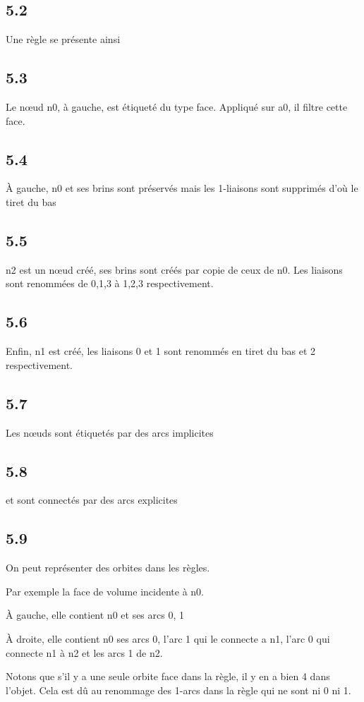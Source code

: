 \documentclass[11pt]{article}
\begin{document}
\subsection{5.2}
\label{sec:orgb3f587e}
Une règle se présente ainsi
\subsection{5.3}
\label{sec:orgb9b09c7}
Le nœud n0, à gauche, est étiqueté du type face. Appliqué sur a0, il filtre cette face.
\subsection{5.4}
\label{sec:orgd238df2}
À gauche, n0 et ses brins sont préservés mais les 1-liaisons sont supprimés d'où le tiret du bas
\subsection{5.5}
\label{sec:orgefde96f}
n2 est un nœud créé, ses brins sont créés par copie de ceux de n0. Les liaisons sont renommées de 0,1,3 à 1,2,3 respectivement.
\subsection{5.6}
\label{sec:org8e15d47}
Enfin, n1 est créé, les liaisons 0 et 1 sont renommés en tiret du bas et 2 respectivement.
\subsection{5.7}
\label{sec:org23bf59f}
Les nœuds sont étiquetés par des arcs implicites
\subsection{5.8}
\label{sec:org91c1dad}
et sont connectés par des arcs explicites
\subsection{5.9}
\label{sec:orgfb6c8ef}
On peut représenter des orbites dans les règles.

Par exemple la face de volume incidente à n0.

À gauche, elle contient n0 et ses arcs 0, 1

À droite, elle contient n0 ses arcs 0, l'arc 1 qui le connecte a n1, l'arc 0 qui
connecte n1 à n2 et les arcs 1 de n2.

Notons que s'il y a une seule orbite face dans la règle, il y en a bien 4 dans l'objet.
Cela est dû au renommage des 1-arcs dans la règle qui ne sont ni 0 ni 1.
\end{document}
